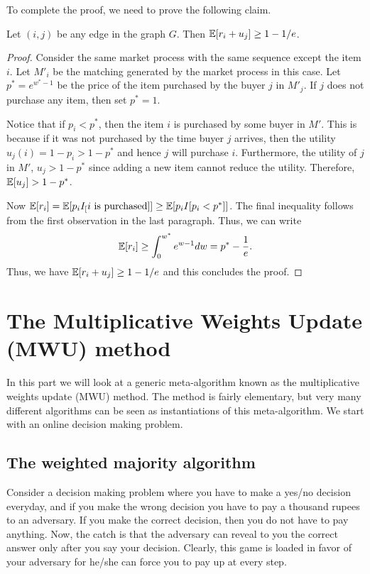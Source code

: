 To complete the proof, we need to prove the following claim.
\begin{claim}
	Let $(i,j)$ be any edge in the graph $G$. Then $\mathbb{E}[r_i + u_j] \geq 1 - 1/e$.
\end{claim}
\begin{proof}
	Consider the same market process with the same sequence except the item $i$. Let $M'_i$ be the matching generated by the market process in this case. Let $p^* = e^{w^* - 1}$ be the price of the item purchased by the buyer $j$ in $M'_j$. If $j$ does not purchase any item, then set $p^* = 1$. 
	
	Notice that if $p_i < p^*$, then the item $i$ is purchased by some buyer in $M'$. This is because if it was not purchased by the time buyer $j$ arrives, then the utility $u_j(i) = 1 - p_i > 1 - p^*$ and hence $j$ will purchase $i$. Furthermore, the utility of $j$ in $M'$, $u_j > 1 - p^*$ since adding a new item cannot reduce the utility. Therefore, $\mathbb{E}[u_j] > 1 - p^*$. 
	
	Now $\mathbb{E}[r_i] = \mathbb{E}[p_i I_[\text{$i$ is purchased}]] \geq \mathbb{E}[p_i I[p_i < p^*]]$. The final inequality follows from the first observation in the last paragraph. Thus, we can write
	\begin{align*}
		\mathbb{E}[r_i] \geq \int_{0}^{w^*} e^{w-1} dw = p^* - \frac{1}{e}.
	\end{align*}
    Thus, we have $\mathbb{E}[r_i + u_j] \geq 1 - 1/e$ and this concludes the proof.
\end{proof}

\section{The Multiplicative Weights Update (MWU) method}

In this part we will look at a generic meta-algorithm known as the multiplicative weights update (MWU) method. The method is fairly elementary, but very many different algorithms can be seen as instantiations of this meta-algorithm. We start with an  online decision making problem.

\subsection{The weighted majority algorithm}

Consider a decision making problem where you have to make a yes/no decision everyday, and if you make the wrong decision you have to pay a thousand rupees to an adversary. If you make the correct decision, then you do not have to pay anything. Now, the catch is that the adversary can reveal to you the correct answer only after you say your decision. Clearly, this game is loaded in favor of your adversary for he/she can force you to pay up at every step.

